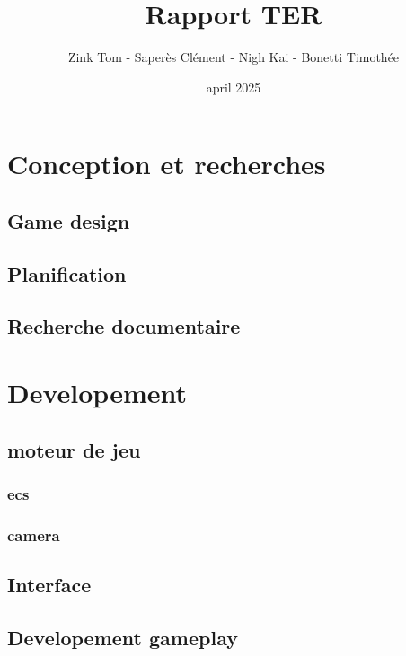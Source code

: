\documentclass[french,a4paper,10pt]{article}
\title{\color{astral} \sffamily \bfseries Rapport TER}
\author{Zink Tom - Saperès Clément - Nigh Kai - Bonetti Timothée}
\date{april 2025}
\begin{document}
\maketitle

\hypersetup{
    hidelinks           %
}

\tableofcontents


\newpage


    

\newpage



\section{Conception et recherches}
    \subsection{Game design}
    \subsection{Planification}
    \subsection{Recherche documentaire}

\section{Developement}
    
    
    \subsection{moteur de jeu}
        \subsubsection{ecs}
        \subsubsection{camera}

    \subsection{Interface}
    
    \subsection{Developement gameplay}
\end{document}
